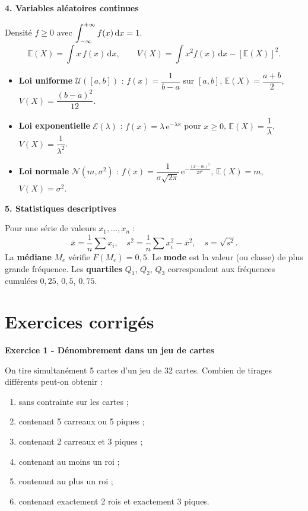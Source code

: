 \documentclass[12pt,a4paper]{article}
\begin{document}
\begin{boiteresume}
\medskip
\textbf{4. Variables aléatoires continues}

Densité $f \geq 0$ avec $\displaystyle\int_{-\infty}^{+\infty} f(x)\,\mathrm{d} x = 1$.
\[
\mathbb{E}(X) = \int x\,f(x)\,\mathrm{d}x, \qquad
V(X) = \int x^2 f(x)\,\mathrm{d}x - [\mathbb{E}(X)]^2.
\]

\begin{itemize}
  \item \textbf{Loi uniforme} $\mathcal{U}([a,b])$ : $f(x)=\dfrac{1}{b-a}$ sur $[a,b]$, $\mathbb{E}(X)=\dfrac{a+b}{2}$, $V(X)=\dfrac{(b-a)^2}{12}$.
  \item \textbf{Loi exponentielle} $\mathcal{E}(\lambda)$ : $f(x)=\lambda\,\mathrm{e}^{-\lambda x}$ pour $x\geq 0$, $\mathbb{E}(X)=\dfrac{1}{\lambda}$, $V(X)=\dfrac{1}{\lambda^2}$.
  \item \textbf{Loi normale} $\mathcal{N}(m,\sigma^2)$ : $f(x)=\dfrac{1}{\sigma\sqrt{2\pi}}\,\mathrm{e}^{-\frac{(x-m)^2}{2\sigma^2}}$, $\mathbb{E}(X)=m$, $V(X)=\sigma^2$.
\end{itemize}

\medskip
\textbf{5. Statistiques descriptives}

Pour une série de valeurs $x_1, \ldots, x_n$ :
\[
\bar{x} = \frac{1}{n}\sum x_i, \quad
s^2 = \frac{1}{n}\sum x_i^2 - \bar{x}^2, \quad
s = \sqrt{s^2}.
\]
La \textbf{médiane} $M_e$ vérifie $F(M_e) = 0{,}5$. Le \textbf{mode} est la valeur (ou classe) de plus grande fréquence. Les \textbf{quartiles} $Q_1$, $Q_2$, $Q_3$ correspondent aux fréquences cumulées $0{,}25$, $0{,}5$, $0{,}75$.
\end{boiteresume}

\section{Exercices corrigés}

\begin{boiteexercice}
\textbf{Exercice 1 - Dénombrement dans un jeu de cartes}\niveau{\facile}

On tire simultanément 5 cartes d'un jeu de 32 cartes. Combien de tirages différents peut-on obtenir :
\begin{enumerate}
  \item sans contrainte sur les cartes ;
  \item contenant 5 carreaux ou 5 piques ;
  \item contenant 2 carreaux et 3 piques ;
  \item contenant au moins un roi ;
  \item contenant au plus un roi ;
  \item contenant exactement 2 rois et exactement 3 piques.
\end{enumerate}
\end{boiteexercice}
\end{document}

